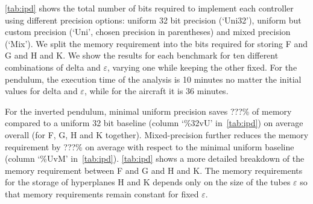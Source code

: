 \autoref{tab:ipd} shows the total number of bits required to implement each
controller using different precision options: uniform 32 bit precision
(`Uni32'), uniform but custom precision (`Uni', chosen precision in parentheses)
and mixed precision (`Mix'). We split the memory requirement into the bits
required for storing F and G and H and K. We show the results for each benchmark
for ten different combinations of delta and $\varepsilon$, varying one while
keeping the other fixed.
For the pendulum, the execution time of the analysis is 10 minutes no matter the
initial values for delta and $\varepsilon$, while for the aircraft it is 36
minutes. 



For the inverted pendulum, minimal uniform precision saves ???\% of memory
compared to a uniform 32 bit baseline (column `\%32vU' in~\autoref{tab:ipd}) on
average overall (for F, G, H and K together). Mixed-precision further reduces the memory
requirement by ???\% on average with respect to the minimal uniform baseline
(column `\%UvM' in~\autoref{tab:ipd}). 
\autoref{tab:ipd} shows a more detailed breakdown of the memory requirement
between F and G and H and K. The memory requirements for the storage of
hyperplanes H and K depends only on the size of the tubes $\varepsilon$ so that
memory requirements remain constant for fixed $\varepsilon$.

